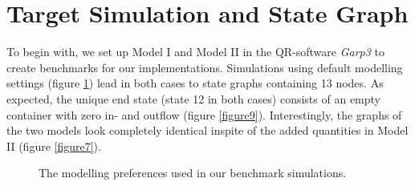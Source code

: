 \documentclass{article}
\begin{document}
\section{Target Simulation and State Graph}

To begin with, we set up Model I and Model II in the QR-software \textit{Garp3} to create benchmarks for our implementations. Simulations using default modelling settings (figure \ref{figure5}) lead in both cases to state graphs containing 13 nodes. As expected, the unique end state (state 12 in both cases) consists of an empty container with zero in- and outflow (figure \ref{figure9}). Interestingly, the graphs of the two models look completely identical inspite of the added quantities in Model II (figure \ref{figure7}).


\begin{figure}[!h]
	\caption{The modelling preferences used in our benchmark simulations.}
	\label{figure5}
\end{figure}


\end{document}
